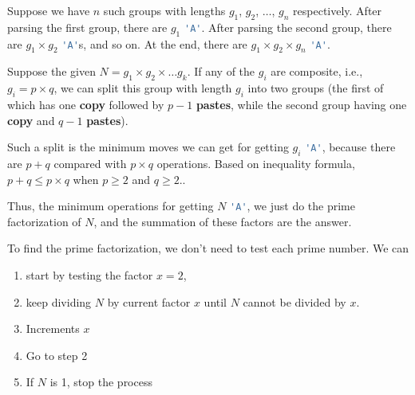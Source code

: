 Suppose we have $n$ such groups with lengths $g_1$, $g_2$, $\ldots$, $g_n$ respectively. After parsing the first group, there are $g_1$ \lstinline[language=Java, basicstyle=\small\ttfamily, keywordstyle=\bfseries\color{green!40!black}]|'A'|. After parsing the second group, there are $g_1 \times g_2$ \lstinline[language=Java, basicstyle=\small\ttfamily, keywordstyle=\bfseries\color{green!40!black}]|'A'|s, and so on. At the end, there are $g_1 \times g_2 \times g_n$ \lstinline[language=Java, basicstyle=\small\ttfamily, keywordstyle=\bfseries\color{green!40!black}]|'A'|.

Suppose the given $N = g_1 \times g_2\times \ldots g_k$. If any of the $g_i$ are composite, i.e., $g_i = p \times q$, we can split this group with length $g_i$ into two groups (the first of which has one \textbf{copy} followed by $p-1$ \textbf{pastes}, while the second group having one \textbf{copy} and $q-1$ \textbf{pastes}).

Such a split is the minimum moves we can get for getting $g_i$ \lstinline[language=Java, basicstyle=\small\ttfamily, keywordstyle=\bfseries\color{green!40!black}]|'A'|, because there are  $p+q$ compared with $p\times q$ operations. Based on inequality formula, $p+q \leq p\times q$ when $p\geq 2$ and $q\geq 2$..

Thus, the minimum operations for getting $N$ \lstinline[language=Java, basicstyle=\small\ttfamily, keywordstyle=\bfseries\color{green!40!black}]|'A'|, we just do the prime factorization of $N$, and the summation of these factors are the answer.

To find the prime factorization, we don't need to test each prime number.  We can 
\begin{enumerate}
\item start by testing the factor $x=2$, 
\item keep dividing $N$ by current factor $x$ until $N$ cannot be divided by $x$. 
\item Increments $x$
\item Go to step 2
\item If $N$ is 1, stop the process
\end{enumerate}